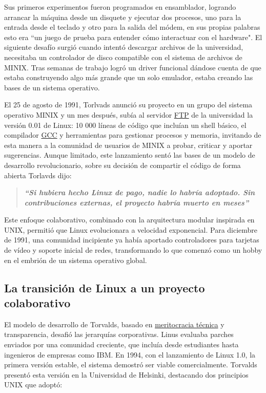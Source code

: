 \documentclass[a4paper,12pt]{article}
\begin{document}
Sus primeros experimentos fueron programados en ensamblador, logrando arrancar
la máquina desde un disquete y ejecutar dos procesos, uno para la entrada desde
el teclado y otro para la salida del módem, en sus propias palabras esto era ``un
juego de prueba para entender cómo interactuar con el hardware". El siguiente
desafío surgió cuando intentó descargar archivos de la universidad, necesitaba
un controlador de disco compatible con el sistema de archivos de MINIX. Tras
semanas de trabajo logró un driver funcional dándose cuenta de que estaba 
construyendo algo más grande que un solo emulador, estaba creando las bases de
un sistema operativo.

El 25 de agosto de 1991, Torlvads anunció su proyecto en un grupo del sistema
operativo MINIX y un mes después, subía al servidor \hyperlink{ftp}{FTP} de la universidad la
versión 0.01 de Linux: 10 000 líneas de código que incluían un shell básico, el
compilador \hyperlink{gcc}{GCC} y herramientas para gestionar procesos y memoria, invitando de
esta manera a la comunidad de usuarios de MINIX a probar, criticar y aportar
sugerencias. Aunque limitado, este lanzamiento sentó las bases de un modelo de
desarrollo revolucionario, sobre su decisión de compartir el código de forma
abierta Torlavds dijo:

\begin{quote}
    \textbf{\textit{“Si hubiera hecho Linux de pago, nadie lo habría
    adoptado. Sin contribuciones externas, el proyecto habría muerto en meses”}} 
\end{quote}

Este enfoque colaborativo, combinado con la arquitectura modular inspirada en
UNIX, permitió que Linux evolucionara a velocidad exponencial. Para diciembre de
1991, una comunidad incipiente ya había aportado controladores para tarjetas de
vídeo y soporte inicial de redes, transformando lo que comenzó como un hobby en
el embrión de un sistema operativo global.

\subsection{La transición de Linux a un proyecto colaborativo}

El modelo de desarrollo de Torvalds, basado en
\hyperlink{meritocracia}{meritocracia técnica} y transparencia, desafió las
jerarquías corporativas. Linus evaluaba parches enviados por una comunidad
creciente, que incluía desde estudiantes hasta ingenieros de empresas como IBM.
En 1994, con el lanzamiento de Linux 1.0, la primera versión estable, el sistema
demostró ser viable comercialmente. Torvalds presentó esta versión en la
Universidad de Helsinki, destacando dos principios UNIX que adoptó:
\end{document}
